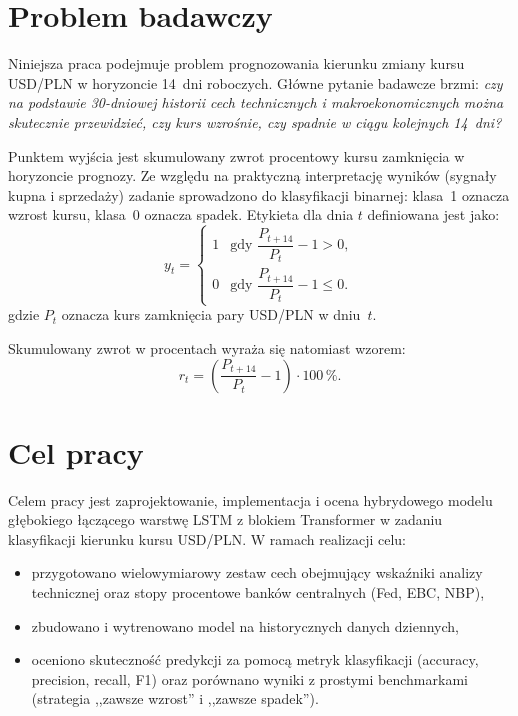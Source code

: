 \section*{Problem badawczy}

Niniejsza praca podejmuje problem prognozowania kierunku zmiany kursu USD/PLN w horyzoncie 14~dni roboczych.
Główne pytanie badawcze brzmi: \emph{czy na podstawie 30-dniowej historii cech technicznych
i makroekonomicznych można skutecznie przewidzieć, czy kurs wzrośnie, czy spadnie w ciągu kolejnych 14~dni?}

Punktem wyjścia jest skumulowany zwrot procentowy kursu zamknięcia w horyzoncie prognozy.
Ze względu na praktyczną interpretację wyników (sygnały kupna i sprzedaży) zadanie sprowadzono
do klasyfikacji binarnej: klasa~1 oznacza wzrost kursu, klasa~0 oznacza spadek.
Etykieta dla dnia $t$ definiowana jest jako:
\begin{equation}
y_t =
\begin{cases}
1 & \text{gdy } \dfrac{P_{t+14}}{P_t} - 1 > 0, \\[6pt]
0 & \text{gdy } \dfrac{P_{t+14}}{P_t} - 1 \le 0.
\end{cases}
\label{eq:target}
\end{equation}
gdzie $P_t$ oznacza kurs zamknięcia pary USD/PLN w dniu~$t$.

Skumulowany zwrot w procentach wyraża się natomiast wzorem:
\begin{equation}
    r_t = \left(\frac{P_{t+14}}{P_t} - 1\right) \cdot 100\,\%.
    \label{eq:return}
\end{equation}

\section*{Cel pracy}

Celem pracy jest zaprojektowanie, implementacja i ocena hybrydowego modelu głębokiego łączącego warstwę LSTM
z blokiem Transformer w zadaniu klasyfikacji kierunku kursu USD/PLN.
W ramach realizacji celu:
\begin{itemize}
    \item przygotowano wielowymiarowy zestaw cech obejmujący wskaźniki analizy technicznej
          oraz stopy procentowe banków centralnych (Fed, EBC, NBP),
    \item zbudowano i wytrenowano model na historycznych danych dziennych,
    \item oceniono skuteczność predykcji za pomocą metryk klasyfikacji
          (accuracy, precision, recall, F1) oraz porównano wyniki z prostymi benchmarkami
          (strategia ,,zawsze wzrost'' i ,,zawsze spadek'').
\end{itemize}

